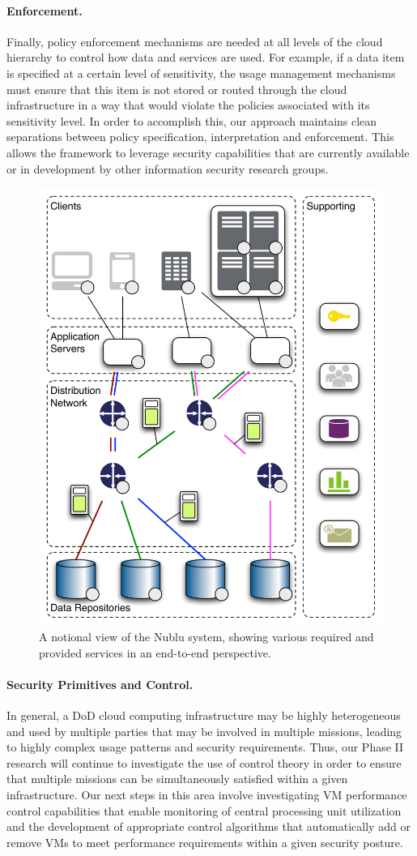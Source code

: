 \documentclass[10pt,letterpaper]{article}
\begin{document}
\paragraph{Enforcement.} Finally, policy enforcement mechanisms are needed at all levels of the cloud hierarchy to control how data and services are used. For example, if a data item is specified at a certain level of sensitivity, the usage management mechanisms must ensure that this item is not stored or routed through the cloud infrastructure in a way that would violate the policies associated with its sensitivity level. In order to accomplish this, our approach maintains clean separations between policy specification, interpretation and enforcement. This allows the framework to leverage security capabilities that are currently available or in development by other information security research groups.

\begin{figure}
\begin{center}
\includegraphics[width=.47\textwidth]{./images/network.pdf}
\end{center}
\caption{A notional view of the Nublu system, showing various required and provided services in an end-to-end perspective.}
\label{fig:network}
\end{figure}

\paragraph{Security Primitives and Control.} In general, a DoD cloud computing infrastructure may be highly heterogeneous and used by multiple parties that may be involved in multiple missions, leading to highly complex usage patterns and security requirements. Thus, our Phase II research will continue to investigate the use of control theory in order to ensure that multiple missions can be simultaneously satisfied within a given infrastructure. Our next steps in this area involve investigating VM performance control capabilities that enable monitoring of central processing unit utilization and the development of appropriate control algorithms that automatically add or remove VMs to meet performance requirements within a given security posture.
\end{document}
